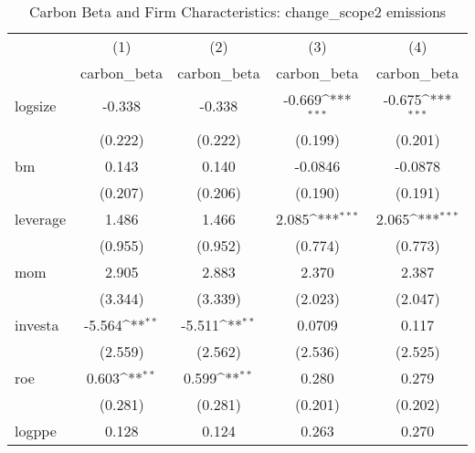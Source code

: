 \begin{table}[htbp]\centering
\def\sym#1{\ifmmode^{#1}\else\(^{#1}\)\fi}
\caption{Carbon Beta and Firm Characteristics: change\_scope2 emissions}
\begin{tabular}{l*{4}{c}}
\hline\hline
                    &\multicolumn{1}{c}{(1)}&\multicolumn{1}{c}{(2)}&\multicolumn{1}{c}{(3)}&\multicolumn{1}{c}{(4)}\\
                    &\multicolumn{1}{c}{carbon\_beta}&\multicolumn{1}{c}{carbon\_beta}&\multicolumn{1}{c}{carbon\_beta}&\multicolumn{1}{c}{carbon\_beta}\\
\hline
logsize             &      -0.338         &      -0.338         &      -0.669\sym{***}&      -0.675\sym{***}\\
                    &     (0.222)         &     (0.222)         &     (0.199)         &     (0.201)         \\
[1em]
bm                  &       0.143         &       0.140         &     -0.0846         &     -0.0878         \\
                    &     (0.207)         &     (0.206)         &     (0.190)         &     (0.191)         \\
[1em]
leverage            &       1.486         &       1.466         &       2.085\sym{***}&       2.065\sym{***}\\
                    &     (0.955)         &     (0.952)         &     (0.774)         &     (0.773)         \\
[1em]
mom                 &       2.905         &       2.883         &       2.370         &       2.387         \\
                    &     (3.344)         &     (3.339)         &     (2.023)         &     (2.047)         \\
[1em]
investa             &      -5.564\sym{**} &      -5.511\sym{**} &      0.0709         &       0.117         \\
                    &     (2.559)         &     (2.562)         &     (2.536)         &     (2.525)         \\
[1em]
roe                 &       0.603\sym{**} &       0.599\sym{**} &       0.280         &       0.279         \\
                    &     (0.281)         &     (0.281)         &     (0.201)         &     (0.202)         \\
[1em]
logppe              &       0.128         &       0.124         &       0.263         &       0.270         \\

\end{tabular}
\end{table}
